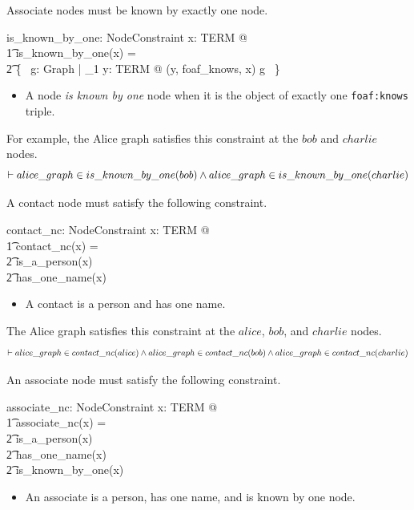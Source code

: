 \documentclass{article}
\begin{document}
\cbstart
Associate nodes must be known by exactly one node.
\cbend
\begin{axdef}
	is\_known\_by\_one: NodeConstraint
\where
	\forall x: TERM @ \\
\t1		is\_known\_by\_one(x) = \\
\t2			\{~ g: Graph | \exists_1 y: TERM @ (y, foaf\_knows, x) \in g ~\}
\end{axdef}
\begin{itemize}
\item A node {\em is known by one} node when it is the object of exactly one {\tt foaf:knows} triple.
\end{itemize}

For example, the Alice graph satisfies this constraint at the $bob$ and $charlie$ nodes.
\[\vdash
	alice\_graph \in is\_known\_by\_one(bob) \land \\
	alice\_graph \in is\_known\_by\_one(charlie)
\]

A contact node must satisfy the following constraint.
\begin{axdef}
	contact\_nc: NodeConstraint
\where
	\forall x: TERM @ \\
\t1		contact\_nc(x) = \\
\t2			is\_a\_person(x) \cap \\
\t2			has\_one\_name(x)
\end{axdef}
\begin{itemize}
\item A contact is a person and has one name.
\end{itemize}

The Alice graph satisfies this constraint at the $alice$, $bob$, and $charlie$ nodes.
\[\vdash
	alice\_graph \in contact\_nc(alice) \land \\
	alice\_graph \in contact\_nc(bob) \land \\
	alice\_graph \in contact\_nc(charlie)
\]

An associate node must satisfy the following constraint.
\begin{axdef}
	associate\_nc: NodeConstraint
\where
	\forall x: TERM @ \\
\t1		associate\_nc(x) = \\
\t2			is\_a\_person(x) \cap \\
\t2			has\_one\_name(x) \cap \\
\t2			is\_known\_by\_one(x)
\end{axdef}
\begin{itemize}
\item An associate is a person, has one name, and is known by one node.
\end{itemize}
\end{document}
